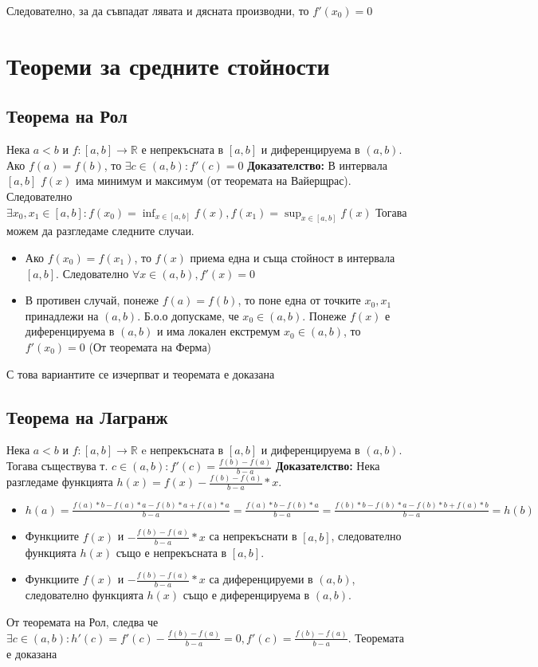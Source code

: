 \documentclass[fleqn,12pt]{article}
\begin{document}
\begin{flushleft}
Следователно, за да съвпадат лявата и дясната производни, то $f'(x_0) = 0$

\section{Теореми  за  средните  стойности}
\subsection{Теорема на Рол}
Нека $a<b$ и $f:[a,b]\rightarrow\mathbb{R}$ е непрекъсната в $[a,b]$ и диференцируема в $(a,b)$. Ако $f(a) = f(b)$, то $\exists c \in (a,b): f'(c)=0$
\bigbreak
\textbf{Доказателство:}
В интервала $[a,b]$ $f(x)$ има минимум и максимум (от теоремата на Вайерщрас).
Следователно $\exists x_0,x_1 \in [a,b]: f(x_0)=\inf_{x \in [a,b]} f(x), f(x_1)=\sup_{x \in [a,b]} f(x)$
Тогава можем да разгледаме следните случаи.
\begin{itemize}
    \item Ако $f(x_0) = f(x_1)$, то $f(x)$ приема една и съща стойност в интервала $[a,b]$. Следователно $\forall x \in (a,b), f'(x)=0$ 

    \item В противен случай, понеже $f(a) = f(b)$, то поне една от точките $x_0,x_1$ принадлежи на $(a,b)$. Б.о.о допускаме, че $x_0 \in (a,b)$. Понеже $f(x)$ е диференцируема в $(a,b)$ и има локален екстремум $x_0 \in (a,b)$, то $f'(x_0) = 0$ (От теоремата на Ферма) 
\end{itemize}
С това вариантите се изчерпват и теоремата е доказана

\subsection{Теорема на Лагранж}
Нека $a<b$ и $f:[a,b]\rightarrow\mathbb{R}$ e непрекъсната в $[a,b]$ и диференцируема в $(a,b)$.
Тогава съществува т. $c \in (a,b): f'(c) = \frac{f(b)-f(a)}{b-a}$
\bigbreak
\textbf{Доказателство:}
Нека разгледаме функцията $h(x)=f(x) - \frac{f(b)-f(a)}{b-a}*x$. 
\begin{itemize}
    \item $h(a)=\frac{f(a)*b - f(a)*a - f(b)*a + f(a)*a}{b-a} = \frac{f(a)*b-f(b)*a}{b-a} = \frac{f(b)*b - f(b)*a - f(b)*b + f(a)*b}{b-a} = h(b)$
    \item Функциите $f(x)$ и $-\frac{f(b)-f(a)}{b-a}*x$ са непрекъснати в $[a,b]$, следователно функцията $h(x)$ също е непрекъсната в $[a,b]$.
    \item Функциите $f(x)$ и $-\frac{f(b)-f(a)}{b-a}*x$ са диференцируеми в $(a,b)$, следователно функцията $h(x)$ също е диференцируема в $(a,b)$.
\end{itemize}
От теоремата на Рол, следва че $\exists c \in (a,b): h'(c) = f'(c) - \frac{f(b)-f(a)}{b-a} = 0, f'(c) = \frac{f(b)-f(a)}{b-a}$.
Теоремата е доказана


\end{flushleft}
\end{document}
